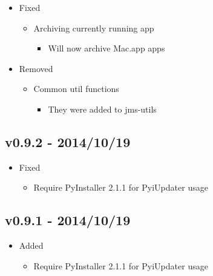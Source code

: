 \documentclass[letterpaper,10pt,english]{sphinxmanual}
\begin{document}
\begin{itemize}
\begin{itemize}
\begin{itemize}
\end{itemize}

\end{itemize}

\item {} 
Fixed
\begin{itemize}
\item {} 
Archiving currently running app
\begin{itemize}
\item {} 
Will now archive Mac.app apps

\end{itemize}

\end{itemize}

\item {} 
Removed
\begin{itemize}
\item {} 
Common util functions
\begin{itemize}
\item {} 
They were added to jms-utils

\end{itemize}

\end{itemize}

\end{itemize}


\subsection{v0.9.2 - 2014/10/19}
\label{release_history:v0-9-2-2014-10-19}\begin{itemize}
\item {} 
Fixed
\begin{itemize}
\item {} 
Require PyInstaller 2.1.1 for PyiUpdater usage

\end{itemize}

\end{itemize}


\subsection{v0.9.1 - 2014/10/19}
\label{release_history:v0-9-1-2014-10-19}\begin{itemize}
\item {} 
Added
\begin{itemize}
\item {} 
Require PyInstaller 2.1.1 for PyiUpdater usage

\end{itemize}

\end{itemize}
\end{document}
